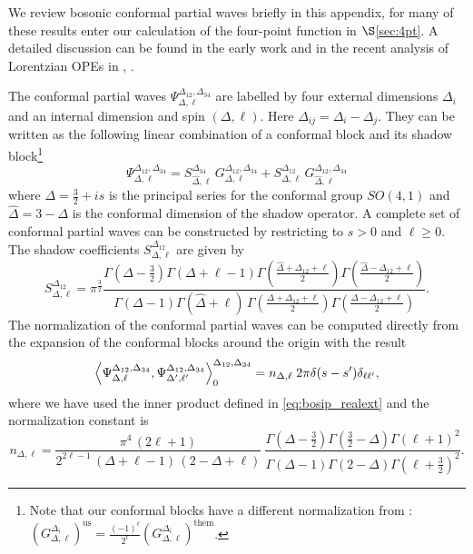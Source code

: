 \documentclass[11pt]{article}
\begin{document}
We review  bosonic conformal partial waves briefly in this appendix, for many of these results enter our calculation of the four-point function in $\S$\ref{sec:4pt}. A detailed discussion can be found in the early work \cite{Dolan:2011dv} and in the recent analysis of Lorentzian OPEs in \cite{Caron-Huot:2017vep}, \cite{Simmons-Duffin:2017nub}.

The conformal partial waves $\Psi_{\Delta,\ell}^{\Delta_{12},\Delta_{34}}$ are labelled by four external dimensions $\Delta_{i}$ and an internal dimension and spin $(\Delta,\ell)$. Here $\Delta_{ij} = \Delta_i -\Delta_j$. 
They can be written as the following linear combination of a conformal block and its shadow block\footnote{Note that our conformal blocks have a different normalization from \cite{Simmons-Duffin:2017nub}: $(G_{\Delta,\ell}^{\Delta_{i}})^{\mathrm{us}} = \frac{(-1)^{\ell}}{2^{\ell}}(G_{\Delta,\ell}^{\Delta_{i}})^{\mathrm{them}}$.}
%
\begin{equation}\label{eq:cpw}
\Psi_{\Delta,\ell}^{\Delta_{12},\Delta_{34}} = 
	S_{\widehat{\Delta},\ell}^{\Delta_{34}}
	\, G_{\Delta,\ell}^{\Delta_{12},\Delta_{34}} +
	S_{\Delta,\ell}^{\Delta_{12}}\, 
	G_{\widehat{\Delta},\ell}^{\Delta_{12},\Delta_{34}}
\end{equation}
%
where $\Delta = \frac{3}{2}+is$ is the principal series for the conformal group $SO(4,1)$ and $\widehat{\Delta}=3-\Delta$ is the conformal dimension of the shadow operator. A complete set of conformal partial waves can be constructed by restricting to $s>0$ and $\ell \geq 0$. The shadow coefficients $S_{\Delta,\ell}^{\Delta_{12}}$ are given by
%
\begin{equation}\label{eq:shadowcoeff}
S_{\Delta,\ell}^{\Delta_{12}} = 
\pi^{\frac{3}{2}}\frac{\Gamma\left(\Delta-\frac{3}{2}\right)\Gamma\left(\Delta+\ell-1\right)\Gamma\left(\frac{\widehat{\Delta}+\Delta_{12}+\ell}{2}\right)\Gamma\left(\frac{\widehat{\Delta}-\Delta_{12}+\ell}{2}\right)}{\Gamma\left(\Delta-1\right)\Gamma(\widehat{\Delta}+\ell)\, \Gamma\left(\frac{\Delta+\Delta_{12}+\ell}{2}\right)\Gamma\left(\frac{\Delta-\Delta_{12}+\ell}{2}\right)}.
\end{equation}
%
The normalization of the conformal partial waves can be computed directly from the expansion of the conformal blocks around the origin with the result
%
\begin{equation}\label{eq:cpw_norm}
\expval{\Psi_{\Delta,\ell}^{\Delta_{12},\Delta_{34}},\Psi_{\Delta',\ell'}^{\Delta_{12},\Delta_{34}}}_{0}^{\Delta_{12},\Delta_{34}} = n_{\Delta,\ell} \;  2\pi\delta(s-s')\delta_{\ell\ell'},
\end{equation}
%
where we have used the inner product defined in \eqref{eq:bosip_realext} and the normalization constant is
%
\begin{equation}\label{eq:normconst}
n_{\Delta,\ell} = \frac{\pi^{4}\,(2\ell+1)}{2^{2\ell-1}\, (\Delta+\ell-1)\,(2-\Delta+\ell)} \ 
	\frac{\Gamma\left(\Delta-\frac{3}{2}\right)\Gamma\left(\frac{3}{2}-\Delta\right)\Gamma\left(\ell+1\right)^{2}}{\Gamma\left(\Delta-1\right)\Gamma\left(2-\Delta\right)\Gamma\left(\ell+\frac{3}{2}\right)^{2}}.
\end{equation}
%
\end{document}
